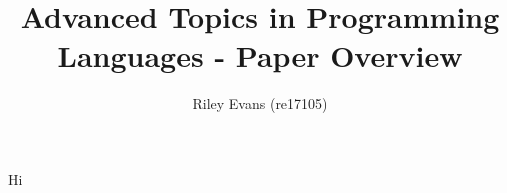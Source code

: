 \documentclass[a4paper, 9pt]{extarticle}
\title{\vspace{-10mm}Advanced Topics in Programming Languages - Paper Overview\vspace{-4mm}}
\author{Riley Evans (re17105)}
\date{\vspace{-3mm}}
\begin{document}
\secfont
\maketitle
\normalfont

Hi
\end{document}
